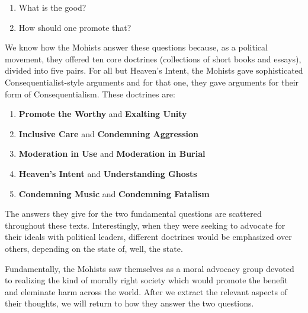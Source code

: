 \begin{enumerate}
\item What is the good?
\item How should one promote that?
\end{enumerate}

We know how the Mohists answer these questions because, as a political movement, they offered ten core doctrines (collections of short books and essays), divided into five pairs. For all but Heaven's Intent, the Mohists gave sophisticated Consequentialist-style arguments and for that one, they gave arguments for their form of Consequentialism. These doctrines are:

\begin{enumerate}
\item \textbf{Promote the Worthy} and \textbf{Exalting Unity}
\item \textbf{Inclusive Care} and \textbf{Condemning Aggression}
\item \textbf{Moderation in Use} and \textbf{Moderation in Burial}
\item \textbf{Heaven's Intent} and \textbf{Understanding Ghosts}
\item \textbf{Condemning Music} and \textbf{Condemning Fatalism}
\end{enumerate}

The answers they give for the two fundamental questions are scattered throughout these texts. Interestingly, when they were seeking to advocate for their ideals with political leaders, different doctrines would be emphasized over others, depending on the state of, well, the state. 


Fundamentally, the Mohists saw themselves as a moral advocacy group devoted to realizing the kind of morally right society which would promote the benefit and eleminate harm across the world. After we extract the relevant aspects of their thoughts, we will return to how they answer the two questions. 


